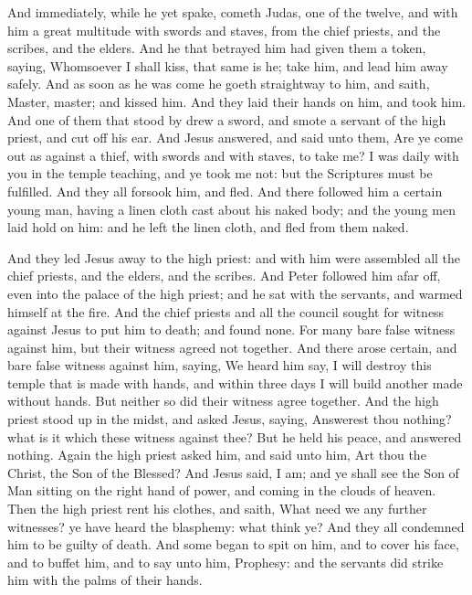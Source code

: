 And immediately, while he yet spake, cometh Judas, one of the twelve, and with him a great multitude with swords and staves, from the chief priests, and the scribes, and the elders. And he that betrayed him had given them a token, saying, Whomsoever I shall kiss, that same is he; take him, and lead him away safely. And as soon as he was come he goeth straightway to him, and saith, Master, master; and kissed him. And they laid their hands on him, and took him. And one of them that stood by drew a sword, and smote a servant of the high priest, and cut off his ear. And Jesus answered, and said unto them, Are ye come out as against a thief, with swords and with staves, to take me? I was daily with you in the temple teaching, and ye took me not: but the Scriptures must be fulfilled. And they all forsook him, and fled. And there followed him a certain young man, having a linen cloth cast about his naked body; and the young men laid hold on him: and he left the linen cloth, and fled from them naked.

And they led Jesus away to the high priest: and with him were assembled all the chief priests, and the elders, and the scribes. And Peter followed him afar off, even into the palace of the high priest; and he sat with the servants, and warmed himself at the fire. And the chief priests and all the council sought for witness against Jesus to put him to death; and found none. For many bare false witness against him, but their witness agreed not together. And there arose certain, and bare false witness against him, saying, We heard him say, I will destroy this temple that is made with hands, and within three days I will build another made without hands. But neither so did their witness agree together. And the high priest stood up in the midst, and asked Jesus, saying, Answerest thou nothing? what is it which these witness against thee? But he held his peace, and answered nothing. Again the high priest asked him, and said unto him, Art thou the Christ, the Son of the Blessed? And Jesus said, I am; and ye shall see the Son of Man sitting on the right hand of power, and coming in the clouds of heaven. Then the high priest rent his clothes, and saith, What need we any further witnesses? ye have heard the blasphemy: what think ye? And they all condemned him to be guilty of death. And some began to spit on him, and to cover his face, and to buffet him, and to say unto him, Prophesy: and the servants did strike him with the palms of their hands.

